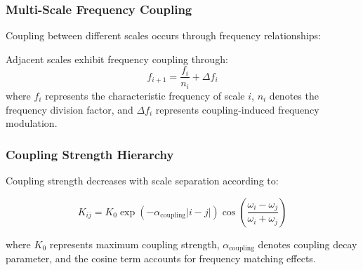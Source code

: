 \subsubsection{Multi-Scale Frequency Coupling}

Coupling between different scales occurs through frequency relationships:

\begin{definition}
Adjacent scales exhibit frequency coupling through:
\begin{equation}
f_{i+1} = \frac{f_i}{n_i} + \Delta f_i
\end{equation}
where $f_i$ represents the characteristic frequency of scale $i$, $n_i$ denotes the frequency division factor, and $\Delta f_i$ represents coupling-induced frequency modulation.
\end{definition}

\subsubsection{Coupling Strength Hierarchy}

Coupling strength decreases with scale separation according to:

\begin{equation}
K_{ij} = K_0 \exp\left(-\alpha_{\text{coupling}}|i-j|\right) \cos\left(\frac{\omega_i - \omega_j}{\omega_i + \omega_j}\right)
\end{equation}

where $K_0$ represents maximum coupling strength, $\alpha_{\text{coupling}}$ denotes coupling decay parameter, and the cosine term accounts for frequency matching effects.
